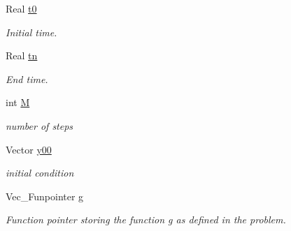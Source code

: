 \begin{DoxyCompactItemize}
\item 
\mbox{\label{class_o_d_e___system_a1947b357608babc98c5e79d645e24c3c}} 
Real \mbox{\hyperlink{class_o_d_e___system_a1947b357608babc98c5e79d645e24c3c}{t0}}
\begin{DoxyCompactList}\small\item\em Initial time. \end{DoxyCompactList}\item 
\mbox{\label{class_o_d_e___system_a5c5a0dd9f04dfb8d8a84d49b741773af}} 
Real \mbox{\hyperlink{class_o_d_e___system_a5c5a0dd9f04dfb8d8a84d49b741773af}{tn}}
\begin{DoxyCompactList}\small\item\em End time. \end{DoxyCompactList}\item 
\mbox{\label{class_o_d_e___system_a46e5ee402ffc7c500dccad753a1fba36}} 
int \mbox{\hyperlink{class_o_d_e___system_a46e5ee402ffc7c500dccad753a1fba36}{M}}
\begin{DoxyCompactList}\small\item\em number of steps \end{DoxyCompactList}\item 
\mbox{\label{class_o_d_e___system_a1379137a4480e5861fd1911bc061f908}} 
Vector \mbox{\hyperlink{class_o_d_e___system_a1379137a4480e5861fd1911bc061f908}{y00}}
\begin{DoxyCompactList}\small\item\em initial condition \end{DoxyCompactList}\item 
\mbox{\label{class_o_d_e___system_a5a294fda765e6cbfd7dfda43755d2c55}} 
Vec\+\_\+\+Funpointer \mbox{\hyperlink{class_o_d_e___system_a5a294fda765e6cbfd7dfda43755d2c55}{g}}
\begin{DoxyCompactList}\small\item\em Function pointer storing the function g as defined in the problem. \end{DoxyCompactList}\item 
\mbox{\label{class_o_d_e___system_a632009677e80b62a1996e842398bf8b6}} 

\end{DoxyCompactItemize}
